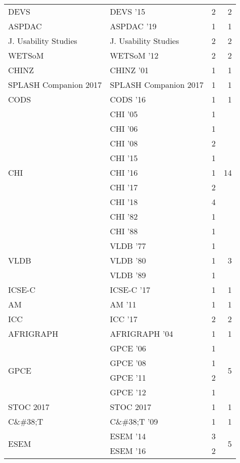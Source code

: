 \begin{table*}[t]
\begin{tabular}{llrr}
\multirow{1}{*}{DEVS } & DEVS '15 & 2 & \multirow{1}{*}{2}\\
\multirow{1}{*}{ASPDAC } & ASPDAC '19 & 1 & \multirow{1}{*}{1}\\
\multirow{1}{*}{J. Usability Studies} & J. Usability Studies & 2 & \multirow{1}{*}{2}\\
\multirow{1}{*}{WETSoM } & WETSoM '12 & 2 & \multirow{1}{*}{2}\\
\multirow{1}{*}{CHINZ } & CHINZ '01 & 1 & \multirow{1}{*}{1}\\
\multirow{1}{*}{SPLASH Companion 2017} & SPLASH Companion 2017 & 1 & \multirow{1}{*}{1}\\
\multirow{1}{*}{CODS } & CODS '16 & 1 & \multirow{1}{*}{1}\\
\multirow{9}{*}{CHI } & CHI '05 & 1 & \multirow{9}{*}{14}\\
& CHI '06 & 1 &\\
& CHI '08 & 2 &\\
& CHI '15 & 1 &\\
& CHI '16 & 1 &\\
& CHI '17 & 2 &\\
& CHI '18 & 4 &\\
& CHI '82 & 1 &\\
& CHI '88 & 1 &\\
\multirow{3}{*}{VLDB } & VLDB '77 & 1 & \multirow{3}{*}{3}\\
& VLDB '80 & 1 &\\
& VLDB '89 & 1 &\\
\multirow{1}{*}{ICSE-C } & ICSE-C '17 & 1 & \multirow{1}{*}{1}\\
\multirow{1}{*}{AM } & AM '11 & 1 & \multirow{1}{*}{1}\\
\multirow{1}{*}{ICC } & ICC '17 & 2 & \multirow{1}{*}{2}\\
\multirow{1}{*}{AFRIGRAPH } & AFRIGRAPH '04 & 1 & \multirow{1}{*}{1}\\
\multirow{4}{*}{GPCE } & GPCE '06 & 1 & \multirow{4}{*}{5}\\
& GPCE '08 & 1 &\\
& GPCE '11 & 2 &\\
& GPCE '12 & 1 &\\
\multirow{1}{*}{STOC 2017} & STOC 2017 & 1 & \multirow{1}{*}{1}\\
\multirow{1}{*}{C\&\#38;T } & C\&\#38;T '09 & 1 & \multirow{1}{*}{1}\\
\multirow{2}{*}{ESEM } & ESEM '14 & 3 & \multirow{2}{*}{5}\\
& ESEM '16 & 2 &\\

\end{tabular}
\end{table*}
